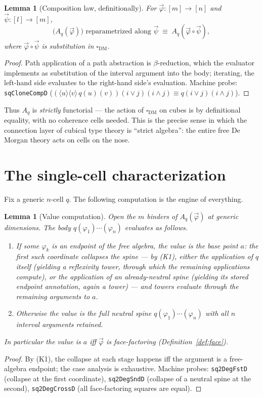 \documentclass[11pt]{amsart}
\newtheorem{lem}[thm]{Lemma}
\theoremstyle{definition}
\newcommand{\Dbox}{\square_{\mathrm{DM}}}
\newcommand{\aconv}{\equiv}
\newcommand{\act}[1]{A_{#1}}
\begin{document}
\begin{lem}[Composition law, definitionally]\label{lem:comp}
  For $\vec\varphi : [m] \to [n]$ and $\vec\psi : [l] \to [m]$,
  \[
    \bigl(\act{q}(\vec\varphi)\bigr)
    \text{ reparametrized along } \vec\psi
    \;\aconv\; \act{q}(\vec\varphi \circ \vec\psi),
  \]
  where $\vec\varphi \circ \vec\psi$ is substitution in $\Dbox$.
\end{lem}
\begin{proof}
  Path application of a path abstraction is $\beta$-reduction, which
  the evaluator implements as substitution of the interval argument
  into the body; iterating, the left-hand side evaluates to the
  right-hand side's evaluation.  Machine probe:
  \texttt{sqCloneCompD} ($(\langle u \rangle \langle v \rangle\,
  q(u)(v))(i \vee j)(i \wedge j) \aconv q(i \vee j)(i \wedge j)$).
\end{proof}

Thus $\act{q}$ is \emph{strictly} functorial --- the action of
$\Dbox$ on cubes is by definitional equality, with no coherence
cells needed.  This is the precise sense in which the connection
layer of cubical type theory is ``strict algebra'': the entire free
De Morgan theory acts on cells on the nose.

\section{The single-cell characterization}
\label{sec:single}

Fix a generic $n$-cell $q$.  The following computation is the
engine of everything.

\begin{lem}[Value computation]\label{lem:value}
  Open the $m$ binders of $\act{q}(\vec\varphi)$ at generic
  dimensions.  The body $q(\varphi_1)\cdots(\varphi_n)$ evaluates
  as follows.
  \begin{enumerate}
  \item If some $\varphi_k$ is an endpoint of the free algebra, the
    value is the base point $a$: the first such coordinate collapses
    the spine --- by (K1), either the application of $q$ itself
    (yielding a reflexivity tower, through which the remaining
    applications compute), or the application of an already-neutral
    spine (yielding its stored endpoint annotation, again a tower)
    --- and towers evaluate through the remaining arguments to $a$.
  \item Otherwise the value is the full neutral spine
    $q(\varphi_1)\cdots(\varphi_n)$ with all $n$ interval arguments
    retained.
  \end{enumerate}
  In particular the value is $a$ iff $\vec\varphi$ is
  face-factoring (Definition~\ref{def:face}).
\end{lem}
\begin{proof}
  By (K1), the collapse at each stage happens iff the argument is a
  free-algebra endpoint; the case analysis is exhaustive.  Machine
  probes: \texttt{sq2DegFstD} (collapse at the first coordinate),
  \texttt{sq2DegSndD} (collapse of a neutral spine at the second),
  \texttt{sq2DegCrossD} (all face-factoring squares are equal).
\end{proof}
\end{document}
